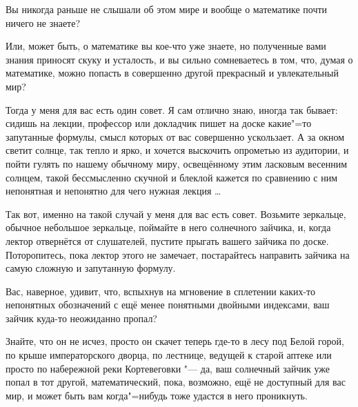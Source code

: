 Вы никогда раньше не слышали об этом мире и вообще о математике почти ничего
не знаете?

Или, может быть, о математике вы кое-что уже знаете, но полученные вами знания
приносят скуку и усталость, и вы сильно сомневаетесь в том, что, думая о
математике, можно попасть в совершенно другой прекрасный и увлекательный мир?

Тогда у меня для вас есть один совет.
Я сам отлично знаю, иногда так бывает: сидишь на лекции, профессор или докладчик
пишет на доске какие"=то запутанные формулы, смысл которых от вас совершенно
ускользает.
А за окном светит солнце, так тепло и ярко, и хочется выскочить опрометью из
аудитории, и пойти гулять по нашему обычному миру, освещённому этим ласковым
весенним солнцем, такой бессмысленно скучной и блеклой кажется по сравнению с
ним непонятная и непонятно для чего нужная лекция \ldots

Так вот, именно на такой случай у меня для вас есть совет.
Возьмите зеркальце, обычное небольшое зеркальце, поймайте в него солнечного
зайчика, и, когда лектор отвернётся от слушателей, пустите прыгать вашего
зайчика по доске.
Поторопитесь, пока лектор этого не замечает, постарайтесь направить зайчика на
самую сложную и запутанную формулу.

Вас, наверное, удивит, что, вспыхнув на мгновение в сплетении каких-то
непонятных обозначений с ещё менее понятными двойными индексами, ваш зайчик
куда-то неожиданно пропал?

Знайте, что он не исчез, просто он скачет теперь где-то в лесу под Белой горой,
по крыше императорского дворца, по лестнице, ведущей к старой аптеке или просто
по набережной реки Кортевеговки "--- да, ваш солнечный зайчик уже попал в тот
другой, математический, пока, возможно, ещё не доступный для вас мир, и может
быть вам когда"=нибудь тоже удастся в него проникнуть.
